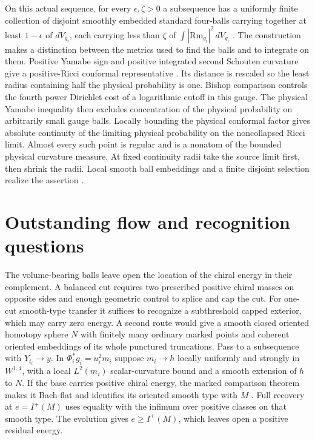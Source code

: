 \documentclass[11pt]{article}
\numberwithin{equation}{section}
\begin{document}
On this actual sequence, for every \(\epsilon,\zeta>0\) a subsequence
has a uniformly finite collection of disjoint smoothly embedded
standard four-balls carrying together at least \(1-\epsilon\) of
\(dV_{g_i}\), each carrying less than \(\zeta\) of
\(\int|\mathrm{Rm}_{g_i}|^2\,dV_{g_i}\)
\cite{Baker2026MarkedLimits}. The construction makes a distinction
between the metrics used to find the balls and to integrate on them.
Positive Yamabe sign and positive integrated second Schouten curvature
give a positive-Ricci conformal representative
\cite[Theorem~A and Corollary~B]{ChangGurskyYang2002PositiveRicci}.
Its distance is rescaled so the least radius containing half the
physical probability is one. Bishop comparison controls the fourth
power Dirichlet cost of a logarithmic cutoff in this gauge. The
physical Yamabe inequality then excludes concentration of the physical
probability on arbitrarily small gauge balls. Locally bounding the
physical conformal factor gives absolute continuity of the limiting
physical probability on the noncollapsed Ricci limit. Almost every
such point is regular and is a nonatom of the bounded physical
curvature measure. At fixed continuity radii take the source limit
first, then shrink the radii. Local smooth ball embeddings and a
finite disjoint selection realize the assertion
\cite[Theorems~2.1, 5.9 and Appendix~A]{CheegerColding1997StructureI}
\cite{Baker2026MarkedLimits}.

\section{Outstanding flow and recognition questions}

The volume-bearing balls leave open the location of the chiral energy
in their complement. A balanced cut requires two prescribed positive chiral masses on opposite
sides and enough geometric control to splice and cap the cut. For
one-cut smooth-type transfer it suffices to recognize a subthreshold
capped exterior, which may carry zero energy. A second
route would give a smooth closed oriented homotopy sphere \(N\) with
finitely many ordinary marked points and coherent oriented embeddings
of its whole punctured truncations. Pass to a subsequence with
\(Y_{t_i}\to y\). In \(\Phi_i^*g_i=u_i^2m_i\) suppose \(m_i\to h\)
locally uniformly and strongly in \(W^{1,4}\), with a local
\(L^2(m_i)\) scalar-curvature bound and a smooth extension of \(h\) to
\(N\). If the base carries positive chiral energy, the marked
comparison theorem makes it Bach-flat and identifies its oriented
smooth type with \(M\)
\cite{Baker2026MarkedNecks,Baker2026MarkedLimits}. Full recovery at
\(e=I^+(M)\) uses equality with the infimum over positive classes on
that smooth type. The evolution gives \(e\ge I^+(M)\), which leaves open a positive residual energy.
\end{document}
